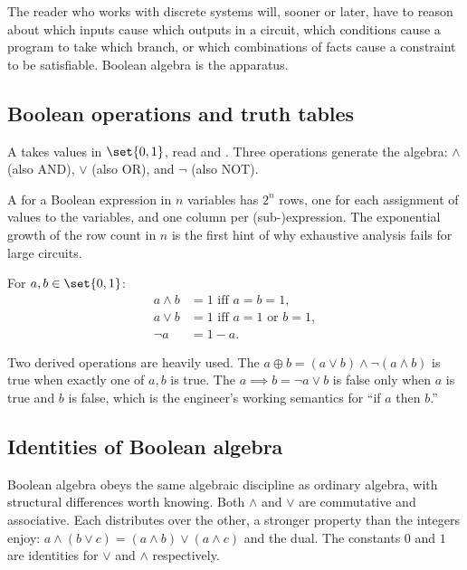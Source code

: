 The reader who works with discrete systems will, sooner or later,
have to reason about which inputs cause which outputs in a circuit,
which conditions cause a program to take which branch, or which
combinations of facts cause a constraint to be satisfiable. Boolean
algebra is the apparatus.

\subsection{Boolean operations and truth tables}

A  takes values in $\set{0, 1}$, read
 and . Three operations generate the
algebra:  $\land$ (also AND), 
$\lor$ (also OR), and  $\lnot$ (also NOT).

A  for a Boolean expression in $n$ variables
has $2^{n}$ rows, one for each assignment of values to the
variables, and one column per (sub-)expression. The exponential
growth of the row count in $n$ is the first hint of why exhaustive
analysis fails for large circuits.

\begin{definition}
For $a, b \in \set{0, 1}$:
\begin{align*}
a \land b &= 1 \text{ iff } a = b = 1, \\
a \lor b &= 1 \text{ iff } a = 1 \text{ or } b = 1, \\
\lnot a &= 1 - a.
\end{align*}
\end{definition}

Two derived operations are heavily used. The 
$a \oplus b = (a \lor b) \land \lnot(a \land b)$ is true when
exactly one of $a, b$ is true. The  $a \implies
b = \lnot a \lor b$ is false only when $a$ is true and $b$ is
false, which is the engineer's working semantics for ``if $a$ then
$b$.''

\subsection{Identities of Boolean algebra}

Boolean algebra obeys the same algebraic discipline as ordinary
algebra, with structural differences worth knowing. Both $\land$
and $\lor$ are commutative and associative. Each distributes over
the other, a stronger property than the integers enjoy: $a \land (b
\lor c) = (a \land b) \lor (a \land c)$ and the dual. The
constants $0$ and $1$ are identities for $\lor$ and $\land$
respectively.


